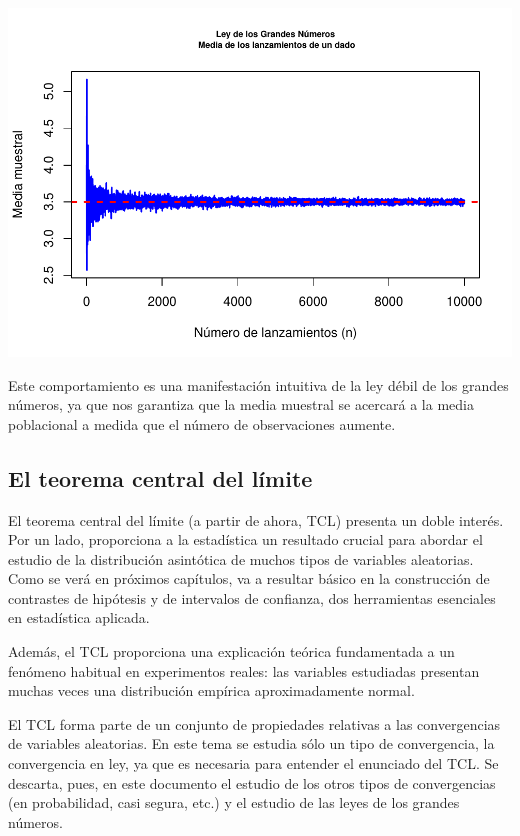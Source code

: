 \documentclass[
]{article}
\begin{document}
\includegraphics{_main_files/figure-latex/unnamed-chunk-13-1.pdf}

Este comportamiento es una manifestación intuitiva de la ley débil de los grandes números, ya que nos garantiza que la media muestral se acercará a la media poblacional a medida que el número de observaciones aumente.

\subsection{El teorema central del límite}\label{el-teorema-central-del-luxedmite}

El teorema central del límite (a partir de ahora, TCL) presenta un doble interés. Por un lado, proporciona a la estadística un resultado crucial para abordar el estudio de la distribución asintótica de muchos tipos de variables aleatorias. Como se verá en próximos capítulos, va a resultar básico en la construcción de contrastes de hipótesis y de intervalos de confianza, dos herramientas esenciales en estadística aplicada.

Además, el TCL proporciona una explicación teórica fundamentada a un fenómeno habitual en experimentos reales: las variables estudiadas presentan muchas veces una distribución empírica aproximadamente normal.

El TCL forma parte de un conjunto de propiedades relativas a las convergencias de variables aleatorias. En este tema se estudia sólo un tipo de convergencia, la convergencia en ley, ya que es necesaria para entender el enunciado del TCL. Se descarta, pues, en este documento el estudio de los otros tipos de convergencias (en probabilidad, casi segura, etc.) y el estudio de las leyes de los grandes números.
\end{document}
